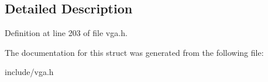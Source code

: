 \subsection{Detailed Description}


Definition at line 203 of file vga.\-h.



The documentation for this struct was generated from the following file\-:\begin{DoxyCompactItemize}
\item 
include/vga.\-h\end{DoxyCompactItemize}
